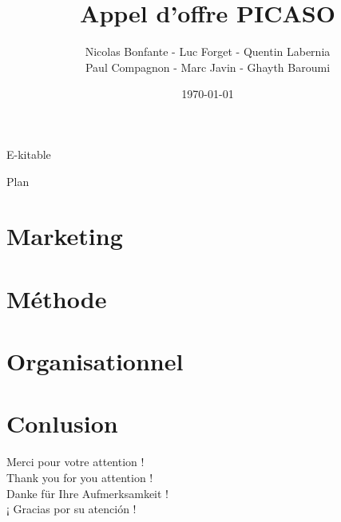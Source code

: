 \documentclass{beamer}
\title{Appel d'offre PICASO}
\author{Nicolas Bonfante - Luc Forget - Quentin Labernia \\ Paul Compagnon - Marc Javin - Ghayth Baroumi}
\institute{INSA Lyon}
\date{\today}
\begin{document}
\begin{frame}
\begin{center}
\huge E-kitable
\end{center}
\maketitle
\end{frame}

\begin{frame}{Plan}
  \tableofcontents
\end{frame}

\section{Marketing}



\section{Méthode}



\section{Organisationnel}



\section{Conlusion}
\begin{frame}
\begin{center}
Merci pour votre attention ! \\
\vspace{1cm}
Thank you for you attention ! \\
\vspace{1cm}
Danke für Ihre Aufmerksamkeit ! \\
\vspace{1cm}
¡ Gracias por su atención ! \\
\end{center}
\end{frame}
\end{document}
